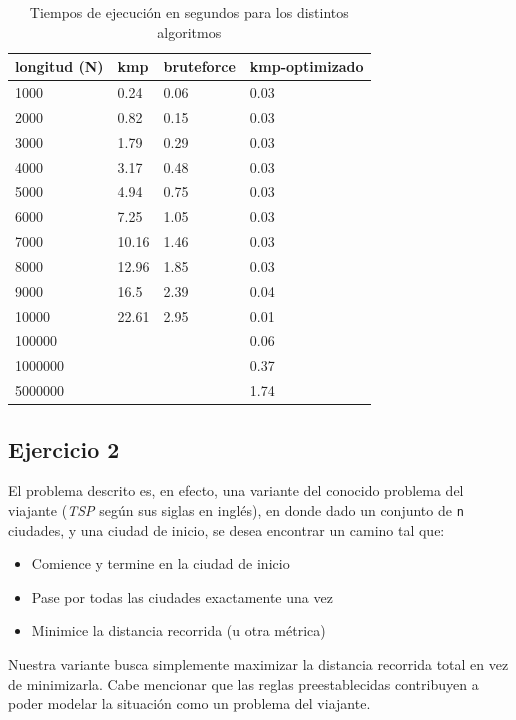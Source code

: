 \documentclass{article}
\begin{document}
\begin{table}[h]
    \begin{center}    

    \begin{tabular}{| l | l | l | l |}
        \hline
        longitud (N) & kmp & bruteforce & kmp-optimizado \\ \hline
        1000 & 0.24 & 0.06 & 0.03 \\ \hline
        2000 & 0.82 & 0.15 & 0.03 \\ \hline
        3000 & 1.79 & 0.29 & 0.03 \\ \hline
        4000 & 3.17 & 0.48 & 0.03 \\ \hline
        5000 & 4.94 & 0.75 & 0.03 \\ \hline
        6000 & 7.25 & 1.05 & 0.03 \\ \hline
        7000 & 10.16 & 1.46 & 0.03 \\ \hline
        8000 & 12.96 & 1.85 & 0.03 \\ \hline
        9000 & 16.5 & 2.39 & 0.04 \\ \hline
        10000 & 22.61 & 2.95 & 0.01 \\ \hline
        100000 &  &  & 0.06 \\ \hline
        1000000 &  &  & 0.37 \\ \hline
        5000000 &  &  & 1.74 \\ \hline
    \end{tabular}
    \caption{Tiempos de ejecución en segundos para los distintos algoritmos}
\end{center}
\end{table}

\subsection{Ejercicio 2}
El problema descrito es, en efecto, una variante del conocido problema del viajante (\textit{TSP} según sus siglas en inglés), en donde dado un conjunto de \texttt{n} ciudades, y una ciudad de inicio, se desea encontrar un camino tal que:
\begin{itemize}
    \item Comience y termine en la ciudad de inicio
    \item Pase por todas las ciudades exactamente una vez
    \item Minimice la distancia recorrida (u otra métrica)
\end{itemize} 

Nuestra variante busca simplemente maximizar la distancia recorrida total en vez de minimizarla. Cabe mencionar que las reglas preestablecidas contribuyen a poder modelar la situación como un problema del viajante.
\end{document}
